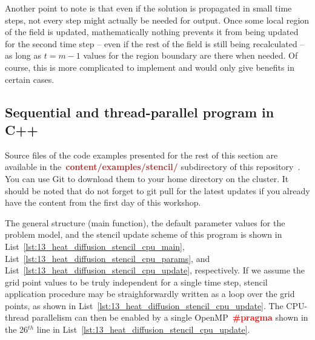 \par
Another point to note is that even if the solution is propagated in small time steps, not every step might actually be needed for output.
Once some local region of the field is updated, mathematically nothing prevents it from being updated for the second time step – even if the rest of the field is still being recalculated – as long as $t=m-1$ values for the region boundary are there when needed.
Of course, this is more complicated to implement and would only give benefits in certain cases.




\subsection{Sequential and thread-parallel program in C++}


\par
Source files of the code examples presented for the rest of this section are available in the~\textbf{\textcolor{brown}{content/examples/stencil/}} subdirectory of this repository~\cite{gpu-programming-examples}.
You can use Git to download them to your home directory on the cluster.
It should be noted that do not forget to git pull for the latest updates if you already have the content from the first day of this workshop.



\par
The general structure (main function), the default parameter values for the problem model, and the stencil update scheme of this program is shown in List~\ref{lst:13_heat_diffusion_stencil_cpu_main}, List~\ref{lst:13_heat_diffusion_stencil_cpu_params}, and List~\ref{lst:13_heat_diffusion_stencil_cpu_update}, respectively. 
If we assume the grid point values to be truly independent for a single time step, stencil application procedure may be straighforwardly written as a loop over the grid points, as shown in List~\ref{lst:13_heat_diffusion_stencil_cpu_update}.
The CPU-thread parallelism can then be enabled by a single OpenMP~\textbf{\textcolor{red}{\#pragma}} shown in the 26$^{th}$ line in List~\ref{lst:13_heat_diffusion_stencil_cpu_update}.





